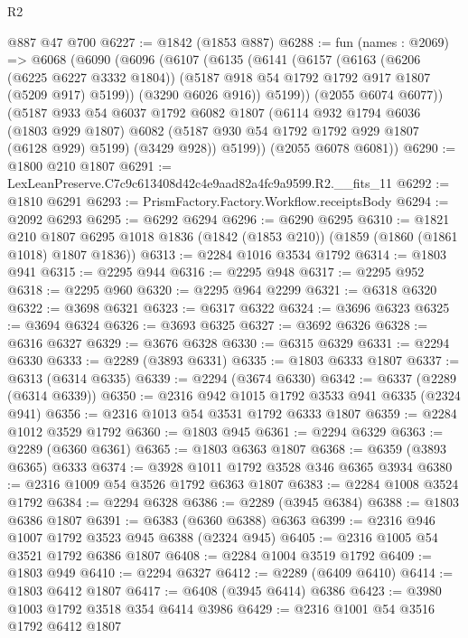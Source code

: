 \begin{lexlean}{R2}
\begin{coremodule}
    @887
    @47
    @700
@6227 := @1842 (@1853 @887)
@6288 := fun (names : @2069) =>
  @6068
    (@6090
      (@6096
        (@6107
          (@6135
            (@6141
              (@6157
                (@6163
                  (@6206 (@6225 @6227 @3332 @1804))
                  (@5187 @918 @54 @1792 @1792 @917 @1807 (@5209 @917) @5199))
                (@3290 @6026 @916))
              @5199))
          (@2055 @6074 @6077))
        (@5187
          @933
          @54
          @6037
          @1792
          @6082
          @1807
          (@6114
            @932
            @1794
            @6036
            (@1803 @929 @1807)
            @6082
            (@5187 @930 @54 @1792 @1792 @929 @1807 (@6128 @929) @5199)
            (@3429 @928))
          @5199))
      (@2055 @6078 @6081))
@6290 := @1800 @210 @1807
@6291 := LexLeanPreserve.C7c9c613408d42c4e9aad82a4fc9a9599.R2.__fits_11
@6292 := @1810 @6291
@6293 := PrismFactory.Factory.Workflow.receiptsBody
@6294 := @2092 @6293
@6295 := @6292 @6294
@6296 := @6290 @6295
@6310 := @1821
    @210
    @1807
    @6295
    @1018
    @1836
    (@1842 (@1853 @210))
    (@1859 (@1860 (@1861 @1018) @1807 @1836))
@6313 := @2284 @1016 @3534 @1792
@6314 := @1803 @941
@6315 := @2295 @944
@6316 := @2295 @948
@6317 := @2295 @952
@6318 := @2295 @960
@6320 := @2295 @964 @2299
@6321 := @6318 @6320
@6322 := @3698 @6321
@6323 := @6317 @6322
@6324 := @3696 @6323
@6325 := @3694 @6324
@6326 := @3693 @6325
@6327 := @3692 @6326
@6328 := @6316 @6327
@6329 := @3676 @6328
@6330 := @6315 @6329
@6331 := @2294 @6330
@6333 := @2289 (@3893 @6331)
@6335 := @1803 @6333 @1807
@6337 := @6313 (@6314 @6335)
@6339 := @2294 (@3674 @6330)
@6342 := @6337 (@2289 (@6314 @6339))
@6350 := @2316 @942 @1015 @1792 @3533 @941 @6335 (@2324 @941)
@6356 := @2316 @1013 @54 @3531 @1792 @6333 @1807
@6359 := @2284 @1012 @3529 @1792
@6360 := @1803 @945
@6361 := @2294 @6329
@6363 := @2289 (@6360 @6361)
@6365 := @1803 @6363 @1807
@6368 := @6359 (@3893 @6365) @6333
@6374 := @3928 @1011 @1792 @3528 @346 @6365 @3934
@6380 := @2316 @1009 @54 @3526 @1792 @6363 @1807
@6383 := @2284 @1008 @3524 @1792
@6384 := @2294 @6328
@6386 := @2289 (@3945 @6384)
@6388 := @1803 @6386 @1807
@6391 := @6383 (@6360 @6388) @6363
@6399 := @2316 @946 @1007 @1792 @3523 @945 @6388 (@2324 @945)
@6405 := @2316 @1005 @54 @3521 @1792 @6386 @1807
@6408 := @2284 @1004 @3519 @1792
@6409 := @1803 @949
@6410 := @2294 @6327
@6412 := @2289 (@6409 @6410)
@6414 := @1803 @6412 @1807
@6417 := @6408 (@3945 @6414) @6386
@6423 := @3980 @1003 @1792 @3518 @354 @6414 @3986
@6429 := @2316 @1001 @54 @3516 @1792 @6412 @1807

\end{coremodule}
\end{lexlean}
